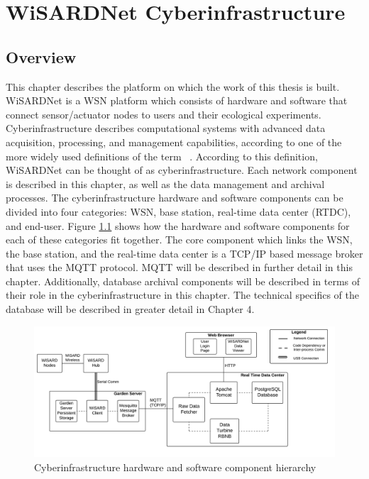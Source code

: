 
\chapter{WiSARDNet Cyberinfrastructure} %
\label{Chapter 3}
\lhead{} %

\section{Overview}
This chapter describes the platform on which the work of this thesis is built. WiSARDNet is a WSN platform which consists of hardware and software that connect sensor/actuator nodes to users and their ecological experiments. Cyberinfrastructure describes computational systems with advanced data acquisition, processing, and management capabilities, according to one of the more widely used definitions of the term ~\cite{stewart10}. According to this definition, WiSARDNet can be thought of as cyberinfrastructure. Each network component is described in this chapter, as well as the data management and archival processes. The cyberinfrastructure hardware and software components can be divided into four categories: WSN, base station, real-time data center (RTDC), and end-user. Figure \ref{fig:device_hierarchy} shows how the hardware and software components for each of these categories fit together. The core component which links the WSN, the base station, and the real-time data center is a TCP/IP based message broker that uses the MQTT protocol. MQTT will be described in further detail in this chapter. Additionally, database archival components will be described in terms of their role in the cyberinfrastructure in this chapter. The technical specifics of the database will be described in greater detail in Chapter 4.

\begin{figure}[H]
	\centering
	\includegraphics[width=\textwidth]{figures/wisardnet_ci_final}
	\caption{Cyberinfrastructure hardware and software component hierarchy}
	\label{fig:device_hierarchy}
\end{figure}


